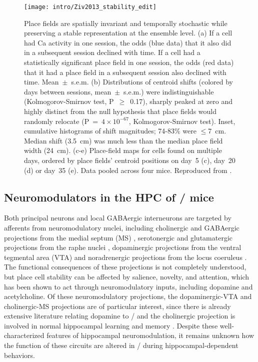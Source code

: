 \begin{figure}
	\centering
	\texttt{[image: intro/Ziv2013\_stability\_edit]}
	\caption[Place field stability in Ziv et al.]{Place fields are spatially invariant and temporally stochastic while preserving a stable representation at the ensemble level.
	(a) If a cell had Ca activity in one session, the odds (blue data) that it also did in a subsequent session declined with time. If a cell had a statistically significant place field in one session, the odds (red data) that it had a place field in a subsequent session also declined with time. Mean~$\pm$~s.e.m.
	(b) Distributions of centroid shifts (colored by days between sessions, mean~$\pm$~s.e.m.) were indistinguishable (Kolmogorov-Smirnov test, P~$\geq$~0.17), sharply peaked at zero and highly distinct from the null hypothesis that place fields would randomly relocate (P~=~$4\times10^{-67}$, Kolmogorov-Smirnov test). Inset, cumulative histograms of shift magnitudes; 74-83\% were $\leq$7~cm. Median shift (3.5~cm) was much less than the median place field width (24~cm).
	(c-e) Place-field maps for cells found on multiple days, ordered by place fields' centroid positions on day~5 (c), day~20 (d) or day~35 (e). Data pooled across four mice.
	Reproduced from \citet{Ziv2013}.}
	\label{fig:conclusions:ziv_stability}
\end{figure}

\subsection{Neuromodulators in the \acl{HPC} of \df/ mice}
Both principal neurons and local GABAergic interneurons are targeted by afferents from neuromodulatory nuclei, including cholinergic and GABAergic projections from the medial septum (MS) \citep{Klausberger2008}, serotonergic and glutamatergic projections from the raphe nuclei \citep{Varga2009}, dopaminergic projections from the ventral tegmental area (VTA) \citep{Gasbarri1997} and noradrenergic projections from the locus coeruleus \citep{Foote1983}.
The functional consequences of these projections is not completely understood, but place cell stability can be affected by salience, novelty, and attention, which has been shown to act through neuromodulatory inputs, including dopamine and acetylcholine.
Of these neuromodulatory projections, the dopaminergic-VTA and cholinergic-MS projections are of particular interest, since there is already extensive literature relating dopamine to \scz/ \citep{Davis1991} and the cholinergic projection is involved in normal hippocampal learning and memory \citep{Parent2004}.
Despite these well-characterized features of hippocampal neuromodulation, it remains unknown how the function of these circuits are altered in \scz/ during hippocampal-dependent behaviors.

